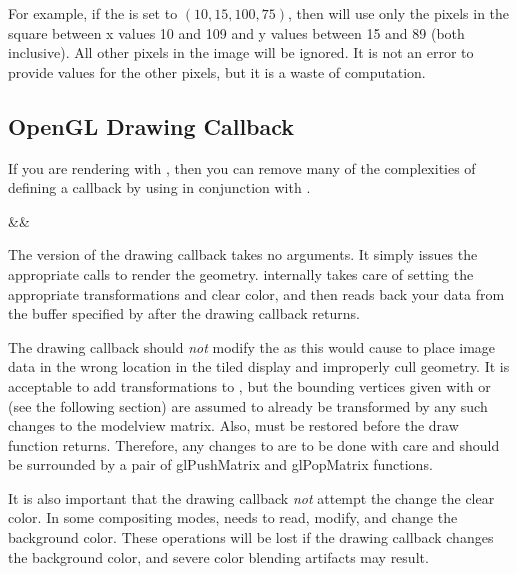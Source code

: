 For example, if the  is set to $(10, 15, 100,
75)$, then \IceT will use only the pixels in the square between x values 10
and 109 and y values between 15 and 89 (both inclusive).  All other pixels
in the image will be ignored.  It is not an error to provide values for the
other pixels, but it is a waste of computation.

\subsection{OpenGL Drawing Callback}
\label{sec:Basic_Usage:Drawing_Callback:OpenGL}

If you are rendering with \OpenGL, then you can remove many of the
complexities of defining a callback by using  in
conjunction with .

 

\begin{Table}{3}
  \textC{(}&&\quad\textC{);}
\end{Table}

The \OpenGL version of the drawing callback takes no arguments.  It simply
issues the appropriate \OpenGL calls to render the geometry.  \IceT
internally takes care of setting the appropriate transformations and clear
color, and then reads back your data from the buffer specified by
 after the drawing callback returns.

The \OpenGL drawing callback should \emph{not} modify the
 as this would cause \IceT to place image
data in the wrong location in the tiled display and improperly cull
geometry.  It is acceptable to add transformations to
, but the bounding vertices given with
 or  (see the following
section) are assumed to already be transformed by any such changes to the
modelview matrix.  Also,  must be restored
before the draw function returns.  Therefore, any changes to
 are to be done with care and should be
surrounded by a pair of glPushMatrix and glPopMatrix functions.

It is also important that the \OpenGL drawing callback \emph{not} attempt
the change the clear color.  In some compositing modes, \IceT needs to
read, modify, and change the background color.  These operations will be
lost if the drawing callback changes the background color, and severe color
blending artifacts may result.

